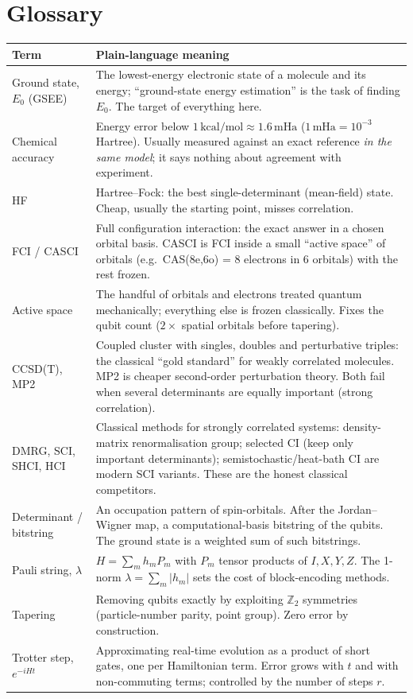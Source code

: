 \documentclass[11pt,a4paper]{article}
\begin{document}
\section{Glossary}\label{sec:glossary}
\begin{center}\small
\begin{tabularx}{\linewidth}{@{}L{3.4cm}Y@{}}
\toprule
Term & Plain-language meaning\\\midrule
Ground state, $E_0$ (GSEE) & The lowest-energy electronic state of a molecule and its energy; ``ground-state energy estimation'' is the task of finding $E_0$. The target of everything here.\\
Chemical accuracy & Energy error below $1\,\mathrm{kcal/mol}\approx1.6\,\mathrm{mHa}$ ($1\,\mathrm{mHa}=10^{-3}$ Hartree). Usually measured against an exact reference \emph{in the same model}; it says nothing about agreement with experiment.\\
HF & Hartree--Fock: the best single-determinant (mean-field) state. Cheap, usually the starting point, misses correlation.\\
FCI / CASCI & Full configuration interaction: the exact answer in a chosen orbital basis. CASCI is FCI inside a small ``active space'' of orbitals (e.g.\ CAS(8e,6o) = 8 electrons in 6 orbitals) with the rest frozen.\\
Active space & The handful of orbitals and electrons treated quantum mechanically; everything else is frozen classically. Fixes the qubit count ($2\times$ spatial orbitals before tapering).\\
CCSD(T), MP2 & Coupled cluster with singles, doubles and perturbative triples: the classical ``gold standard'' for weakly correlated molecules. MP2 is cheaper second-order perturbation theory. Both fail when several determinants are equally important (strong correlation).\\
DMRG, SCI, SHCI, HCI & Classical methods for strongly correlated systems: density-matrix renormalisation group; selected CI (keep only important determinants); semistochastic/heat-bath CI are modern SCI variants. These are the honest classical competitors.\\
Determinant / bitstring & An occupation pattern of spin-orbitals. After the Jordan--Wigner map, a computational-basis bitstring of the qubits. The ground state is a weighted sum of such bitstrings.\\
Pauli string, $\lambda$ & $H=\sum_m h_m P_m$ with $P_m$ tensor products of $I,X,Y,Z$. The 1-norm $\lambda=\sum_m|h_m|$ sets the cost of block-encoding methods.\\
Tapering & Removing qubits exactly by exploiting $\mathbb{Z}_2$ symmetries (particle-number parity, point group). Zero error by construction.\\
Trotter step, $e^{-iHt}$ & Approximating real-time evolution as a product of short gates, one per Hamiltonian term. Error grows with $t$ and with non-commuting terms; controlled by the number of steps $r$.\\
\bottomrule
\end{tabularx}
\end{center}
\end{document}
